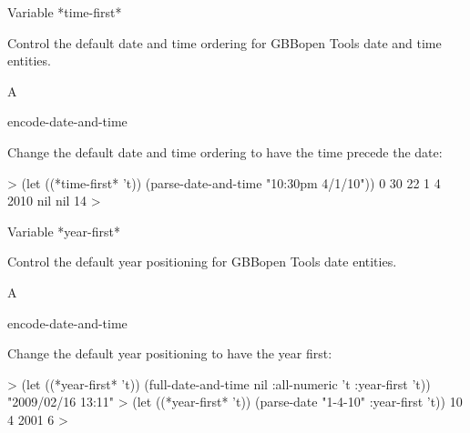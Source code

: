 \documentclass[10pt,twoside,english,pdftex]{article}
\begin{document}
\begin{functiondoc}{Variable}%
{*time-first*}{}%

\fnsyntax

\fnpurpose Control the default date and time ordering for GBBopen Tools date
and time entities.

\fnpackage {}

\fnmodule {}

\fnvaluetype A 

\fninitialvalue \nil

\begin{alsos}{encode-date-and-time}
\end{alsos}

\fnexample
Change the default date and time ordering to have the time precede the date:
%
\W\supp
\begin{example}
  > (let ((*time-first* 't))
      (parse-date-and-time "10:30pm 4/1/10"))
  0
  30
  22
  1
  4
  2010
  nil
  nil
  14
  >
\end{example}

\end{functiondoc}


\begin{functiondoc}{Variable}%
{*year-first*}{}%

\fnsyntax

\fnpurpose Control the default year positioning for GBBopen Tools date
 entities.

\fnpackage {}

\fnmodule {}

\fnvaluetype A 

\fninitialvalue \nil

\begin{alsos}{encode-date-and-time}
\end{alsos}

\fnexample
Change the default year positioning to have the year first:
%
\W\supp
\begin{example}
  > (let ((*year-first* 't))
      (full-date-and-time nil :all-numeric 't :year-first 't))
  "2009/02/16 13:11"
  > (let ((*year-first* 't))
      (parse-date "1-4-10" :year-first 't))
  10
  4
  2001
  6
  >
\end{example}

\end{functiondoc}
\end{document}
